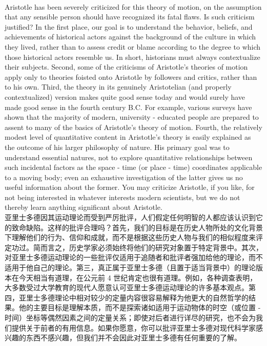 \documentclass{article}
\begin{document}
\\
Aristotle has been severely criticized for this theory of motion, on the assumption that any sensible person should have recognized its fatal flaws. Is such criticism justified? In the first place, our goal is to understand the behavior, beliefs, and achievements of historical actors against the background of the culture in which they lived, rather than to assess credit or blame according to the degree to which those historical actors resemble us. In short, historians must always contextualize their subjects. Second, some of the criticisms of Aristotle’s theories of motion apply only to theories foisted onto Aristotle by followers and critics, rather than to his own. Third, the theory in its genuinely Aristotelian (and properly contextualized) version makes quite good sense today and would surely have made good sense in the fourth century B.C. For example, various surveys have shown that the majority of modern, university - educated people are prepared to assent to many of the basics of Aristotle’s theory of motion. Fourth, the relatively modest level of quantitative content in Aristotle’s theory is easily explained as the outcome of his larger philosophy of nature. His primary goal was to understand essential natures, not to explore quantitative relationships between such incidental factors as the space - time (or place - time) coordinates applicable to a moving body; even an exhaustive investigation of the latter gives us no useful information about the former. You may criticize Aristotle, if you like, for not being interested in whatever interests modern scientists, but we do not thereby learn anything significant about Aristotle.\\
亚里士多德因其运动理论而受到严厉批评，人们假定任何明智的人都应该认识到它的致命缺陷。这样的批评合理吗？首先，我们的目标是在历史人物所处的文化背景下理解他们的行为、信仰和成就，而不是根据这些历史人物与我们的相似程度来评定功过。简而言之，历史学家必须始终将他们的研究对象置于特定背景中。其次，对亚里士多德运动理论的一些批评仅适用于追随者和批评者强加给他的理论，而不适用于他自己的理论。第三，真正属于亚里士多德（且置于适当背景中）的理论版本在今天相当有道理，在公元前 4 世纪肯定也很有道理。例如，各种调查表明，大多数受过大学教育的现代人愿意认可亚里士多德运动理论的许多基本观点。第四，亚里士多德理论中相对较少的定量内容很容易解释为他更大的自然哲学的结果。他的主要目标是理解本质，而不是探索诸如适用于运动物体的时空（或位置 - 时间）坐标等偶然因素之间的定量关系；即使对后者进行详尽的研究，也不会为我们提供关于前者的有用信息。如果你愿意，你可以批评亚里士多德对现代科学家感兴趣的东西不感兴趣，但我们并不会因此对亚里士多德有任何重要的了解。\\
\end{document}
